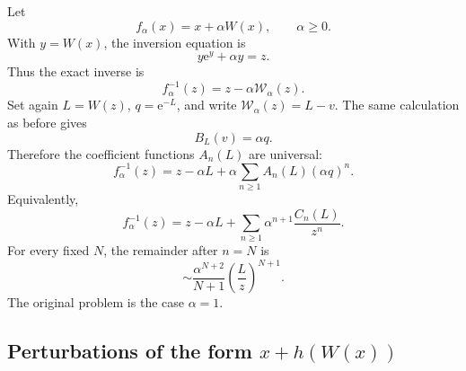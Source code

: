 \documentclass[11pt,a4paper]{article}
\numberwithin{equation}{section}
\theoremstyle{definition}
\theoremstyle{remark}
\newcommand{\e}{\mathrm e}
\newcommand{\rW}{\mathcal W}
\newcommand{\Acoef}{A}
\newcommand{\Ccoef}{C}
\begin{document}
Let
\begin{equation}\label{eq:f-alpha}
  f_\alpha(x)=x+\alpha W(x),
  \qquad \alpha\ge0.
\end{equation}
With \(y=W(x)\), the inversion equation is
\begin{equation}\label{eq:f-alpha-y}
  y\e^y+\alpha y=z.
\end{equation}
Thus the exact inverse is
\begin{equation}\label{eq:f-alpha-exact}
  f_\alpha^{-1}(z)=z-\alpha\rW_\alpha(z).
\end{equation}
Set again \(L=W(z)\), \(q=\e^{-L}\), and write
\(\rW_\alpha(z)=L-v\).  The same calculation as before gives
\begin{equation}\label{eq:alpha-B-equation}
  B_L(v)=\alpha q.
\end{equation}
Therefore the coefficient functions \(\Acoef_n(L)\) are universal:
\begin{equation}\label{eq:f-alpha-q-expansion}
 f_\alpha^{-1}(z)
 =z-\alpha L
 +\alpha\sum_{n\ge1}\Acoef_n(L)(\alpha q)^n.
\end{equation}
Equivalently,
\begin{equation}\label{eq:f-alpha-z-expansion}
 f_\alpha^{-1}(z)
 =z-\alpha L
 +\sum_{n\ge1}\alpha^{n+1}
   \frac{\Ccoef_n(L)}{z^n}.
\end{equation}
For every fixed \(N\), the remainder after \(n=N\) is
\begin{equation}\label{eq:f-alpha-error}
 \sim \frac{\alpha^{N+2}}{N+1}
 \left(\frac{L}{z}\right)^{N+1}.
\end{equation}
The original problem is the case \(\alpha=1\).

\subsection[Perturbations of the form x+h(W(x))]{Perturbations of the form \(x+h(W(x))\)}
\end{document}
